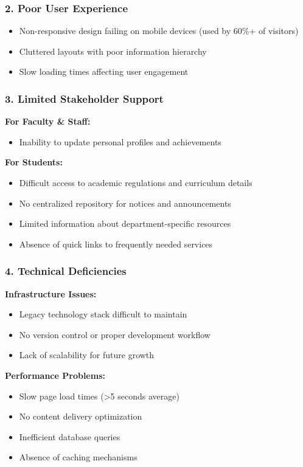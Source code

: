 \documentclass[12pt,a4paper]{report}
\begin{document}
\subsubsection*{2. Poor User Experience}
\begin{itemize}
    \item Non-responsive design failing on mobile devices (used by 60\%+ of visitors)
    \item Cluttered layouts with poor information hierarchy
    \item Slow loading times affecting user engagement
\end{itemize}

\subsubsection*{3. Limited Stakeholder Support}
\textbf{For Faculty \& Staff:}
\begin{itemize}
    \item Inability to update personal profiles and achievements
\end{itemize}
\textbf{For Students:}
\begin{itemize}
    \item Difficult access to academic regulations and curriculum details
    \item No centralized repository for notices and announcements
    \item Limited information about department-specific resources
    \item Absence of quick links to frequently needed services
\end{itemize}

\subsubsection*{4. Technical Deficiencies}

\textbf{Infrastructure Issues:}
\begin{itemize}
    \item Legacy technology stack difficult to maintain
    \item No version control or proper development workflow
    \item Lack of scalability for future growth
\end{itemize}
\textbf{Performance Problems:}
\begin{itemize}
    \item Slow page load times (>5 seconds average)
    \item No content delivery optimization
    \item Inefficient database queries
    \item Absence of caching mechanisms
\end{itemize}
\end{document}
